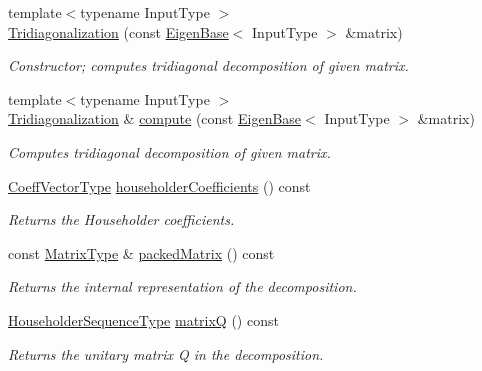 \begin{DoxyCompactItemize}
{\footnotesize template$<$typename Input\+Type $>$ }\\\hyperlink{group___eigenvalues___module_a05406b7df9a92fdcba72d31443f67a98}{Tridiagonalization} (const \hyperlink{group___core___module_struct_eigen_1_1_eigen_base}{Eigen\+Base}$<$ Input\+Type $>$ \&matrix)
\begin{DoxyCompactList}\small\item\em Constructor; computes tridiagonal decomposition of given matrix. \end{DoxyCompactList}\item 
{\footnotesize template$<$typename Input\+Type $>$ }\\\hyperlink{group___eigenvalues___module_class_eigen_1_1_tridiagonalization}{Tridiagonalization} \& \hyperlink{group___eigenvalues___module_acd288abb081d3b40b87e4b98cd8f6ee9}{compute} (const \hyperlink{group___core___module_struct_eigen_1_1_eigen_base}{Eigen\+Base}$<$ Input\+Type $>$ \&matrix)
\begin{DoxyCompactList}\small\item\em Computes tridiagonal decomposition of given matrix. \end{DoxyCompactList}\item 
\hyperlink{group___core___module}{Coeff\+Vector\+Type} \hyperlink{group___eigenvalues___module_ac95b4e43dcf6c3c5074b8bea4fc67887}{householder\+Coefficients} () const
\begin{DoxyCompactList}\small\item\em Returns the Householder coefficients. \end{DoxyCompactList}\item 
const \hyperlink{group___eigenvalues___module_add0f4b2216d0ea8ee0f7d8525deaf0a9}{Matrix\+Type} \& \hyperlink{group___eigenvalues___module_a47858b3895e64acafb1bb2e97f98a154}{packed\+Matrix} () const
\begin{DoxyCompactList}\small\item\em Returns the internal representation of the decomposition. \end{DoxyCompactList}\item 
\hyperlink{group___eigenvalues___module_af322315c8bea9990152c9d09bfa2a69f}{Householder\+Sequence\+Type} \hyperlink{group___eigenvalues___module_a000f7392eda930576ffd2af1fae54af2}{matrixQ} () const
\begin{DoxyCompactList}\small\item\em Returns the unitary matrix Q in the decomposition. \end{DoxyCompactList}\item 

\end{DoxyCompactItemize}
